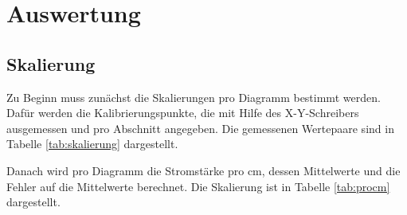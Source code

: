 \section{Auswertung}
\subsection{Skalierung}
Zu Beginn muss zunächst die Skalierungen pro Diagramm bestimmt werden. Dafür
werden die Kalibrierungspunkte, die mit Hilfe des X-Y-Schreibers ausgemessen
und pro Abschnitt angegeben. Die gemessenen Wertepaare sind in Tabelle
\ref{tab:skalierung} dargestellt.


Danach wird pro Diagramm die Stromstärke pro $\si{\centi\meter}$, dessen
Mittelwerte und die Fehler auf die Mittelwerte berechnet. Die Skalierung ist
in Tabelle \ref{tab:procm} dargestellt.


